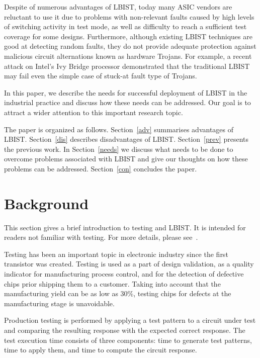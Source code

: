 \documentclass[conference]{IEEEtran}
\begin{document}
Despite of numerous advantages of LBIST, today many ASIC vendors are reluctant to use it due to problems with non-relevant faults caused by high levels of switching activity
in test mode, as well as difficulty to reach a sufficient test coverage for some designs.
Furthermore, although existing LBIST techniques are good at detecting random faults, they
do not provide adequate protection against malicious circuit alternations known as hardware Trojans.
For example, a recent attack on Intel's Ivy Bridge processor demonstrated that the traditional LBIST
may fail even the simple case of stuck-at fault type of Trojans.

In this paper, we describe the needs for successful deployment of LBIST in the industrial practice
and discuss how these needs can be addressed. Our goal is to attract a wider attention to this important research topic.  

The paper is organized as follows.  
Section~\ref{adv} summarises advantages of LBIST.
Section~\ref{dis} describes disadvantages of LBIST.
Section~\ref{prev} presents the previous work. 
In Section~\ref{needs} we discuss what needs to be done to overcome problems associated with LBIST and give our thoughts on how these problems can be addressed.
Section~\ref{con} concludes the paper.

\section{Background}

This section gives a brief introduction to testing and LBIST. It is intended for readers not familiar with testing. For more details, please see~\cite{AbBF94,RaT98}. 

Testing has been an important topic in electronic industry since the first transistor was created. Testing is used as a part of design validation, as a quality indicator for manufacturing process control, and for the detection of defective chips prior shipping them to a customer. Taking into account that the manufacturing yield  can be as low as 30\%, testing chips for defects at the manufacturing stage is unavoidable.

Production testing is performed by applying a test pattern to a circuit under test and comparing the resulting response with the expected correct response. The test execution time consists of
three components: time to generate test patterns, time to apply them, and time to compute the
circuit response. 
\end{document}
